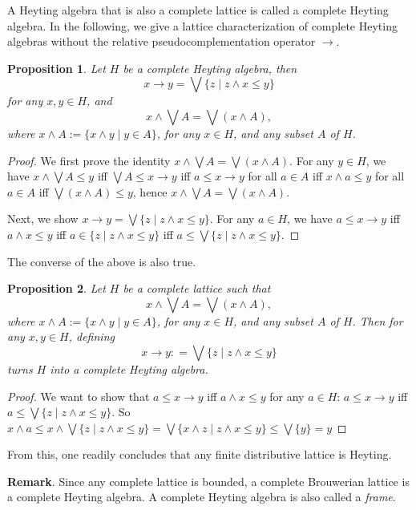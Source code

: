 \documentclass[12pt]{article}
\newtheorem{prop}{Proposition}
\begin{document}
A Heyting algebra that is also a complete lattice is called a complete Heyting algebra.  In the following, we give a lattice characterization of complete Heyting algebras without the relative pseudocomplementation operator $\to$.

\begin{prop}  Let $H$ be a complete Heyting algebra, then $$x\to y = \bigvee \lbrace z\mid z\wedge x \le y\rbrace$$ for any $x,y\in H$, and $$x \wedge \bigvee A = \bigvee (x\wedge A),$$ where $x\wedge A:=\lbrace x\wedge y\mid y\in A\rbrace$, for any $x\in H$, and any subset $A$ of $H$.
\end{prop}
\begin{proof} We first prove the identity $x \wedge \bigvee A = \bigvee (x\wedge A)$.  For any $y \in H$, we have 
$x \wedge \bigvee A \le y$ iff $\bigvee A \le x\to y$ iff $a\le x\to y$ for all $a\in A$ iff $x\wedge a \le y$ for all $a\in A$ iff $\bigvee (x\wedge A) \le y$, hence $x\wedge \bigvee A = \bigvee (x\wedge A)$.

Next, we show $x\to y = \bigvee \lbrace z\mid z\wedge x \le y \rbrace$.  For any $a\in H$, we have $a\le x\to y$ iff $a\wedge x\le y$ iff $a\in \lbrace z\mid z\wedge x\le y\rbrace$ iff $a\le \bigvee \lbrace z\mid z\wedge x\le y\rbrace$.
\end{proof}

The converse of the above is also true.

\begin{prop}  Let $H$ be a complete lattice such that $$x \wedge \bigvee A = \bigvee (x\wedge A),$$ where $x\wedge A:=\lbrace x\wedge y\mid y\in A\rbrace$, for any $x\in H$, and any subset $A$ of $H$.  Then for any $x,y\in H$, defining $$x\to y: = \bigvee \lbrace z\mid z\wedge x \le y\rbrace$$ turns $H$ into a complete Heyting algebra.
\end{prop}
\begin{proof} We want to show that $a\le x\to y$ iff $a\wedge x\le y$ for any $a\in H$: $a\le x\to y$ iff $a\le \bigvee \lbrace z\mid z\wedge x\le y\rbrace$.  So $x\wedge a \le x \wedge \bigvee \lbrace z\mid z\wedge x\le y\rbrace = \bigvee \lbrace x\wedge z\mid z\wedge x\le y\rbrace \le \bigvee \lbrace y \rbrace = y$
\end{proof}

From this, one readily concludes that any finite distributive lattice is Heyting.

\textbf{Remark}.  Since any complete lattice is bounded, a complete Brouwerian lattice is a complete Heyting algebra.  A complete Heyting algebra is also called a \emph{frame}.

\end{document}
